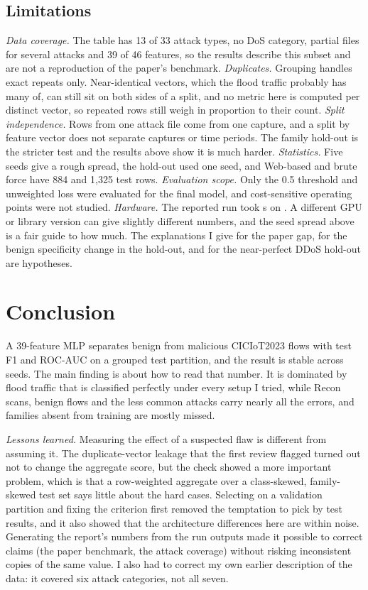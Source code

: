 \documentclass[conference]{IEEEtran}
\begin{document}
\subsection{Limitations}
\emph{Data coverage.} The table has 13 of 33 attack types, no DoS category, partial files for several attacks and 39 of 46 features, so the results describe this subset and are not a reproduction of the paper's benchmark. \emph{Duplicates.} Grouping handles exact repeats only. Near-identical vectors, which the flood traffic probably has many of, can still sit on both sides of a split, and no metric here is computed per distinct vector, so repeated rows still weigh in proportion to their count. \emph{Split independence.} Rows from one attack file come from one capture, and a split by feature vector does not separate captures or time periods. The family hold-out is the stricter test and the results above show it is much harder. \emph{Statistics.} Five seeds give a rough spread, the hold-out used one seed, and Web-based and brute force have 884 and 1{,}325 test rows. \emph{Evaluation scope.} Only the 0.5 threshold and unweighted loss were evaluated for the final model, and cost-sensitive operating points were not studied. \emph{Hardware.} The reported run took \RunSeconds{} s on \RunDevice{}. A different GPU or library version can give slightly different numbers, and the seed spread above is a fair guide to how much. The explanations I give for the paper gap, for the benign specificity change in the hold-out, and for the near-perfect DDoS hold-out are hypotheses.

\section{Conclusion}
A 39-feature MLP separates benign from malicious CICIoT2023 flows with test F1 \MainFOne{} and ROC-AUC \MainAuc{} on a grouped test partition, and the result is stable across seeds. The main finding is about how to read that number. It is dominated by flood traffic that is classified perfectly under every setup I tried, while Recon scans, benign flows and the less common attacks carry nearly all the errors, and families absent from training are mostly missed.

\emph{Lessons learned.} Measuring the effect of a suspected flaw is different from assuming it. The duplicate-vector leakage that the first review flagged turned out not to change the aggregate score, but the check showed a more important problem, which is that a row-weighted aggregate over a class-skewed, family-skewed test set says little about the hard cases. Selecting on a validation partition and fixing the criterion first removed the temptation to pick by test results, and it also showed that the architecture differences here are within noise. Generating the report's numbers from the run outputs made it possible to correct claims (the paper benchmark, the attack coverage) without risking inconsistent copies of the same value. I also had to correct my own earlier description of the data: it covered six attack categories, not all seven.
\end{document}
